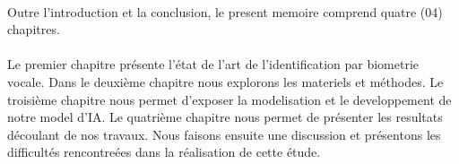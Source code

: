 \paragraph{}Outre l’introduction et la conclusion, le present memoire comprend quatre (04) chapitres.
\paragraph{}Le premier chapitre présente l’état de l’art de l’identification par biometrie vocale.  Dans le deuxième chapitre nous explorons les materiels et méthodes. Le troisième chapitre nous permet d’exposer la modelisation et le developpement de notre model d’IA. Le quatrième chapitre nous permet de présenter les resultats découlant de nos travaux. Nous faisons ensuite une discussion et présentons les difficultés rencontreées dans la réalisation de  cette étude. 
